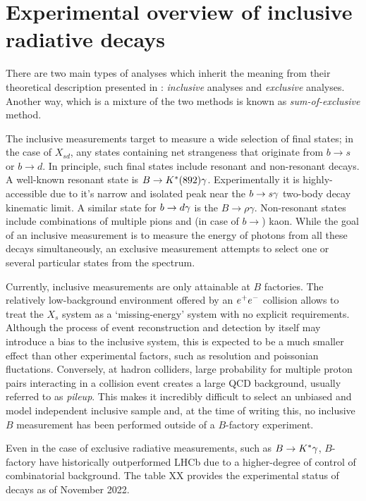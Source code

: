 \chapter{Experimental overview of inclusive radiative decays}

There are two main types of analyses which inherit the meaning from their theoretical description presented in : \textit{inclusive} analyses and \textit{exclusive} analyses.
Another way, which is a mixture of the two methods is known as \textit{sum-of-exclusive} method.

The inclusive measurements target to measure a wide selection of final states; in the case of $X_{sd}$, any states containing net strangeness that originate from $b\to s$ or $b\to d$.
In principle, such final states include resonant and non-resonant decays.
A well-known resonant state is $B\rightarrow K^*(892)\gamma$.
Experimentally it is highly-accessible due to it's narrow and isolated peak near the $b\rightarrow s\gamma$ two-body decay kinematic limit.
A similar state for $b\rightarrow d\gamma$ is the $B\rightarrow \rho\gamma$.
Non-resonant states include combinations of multiple pions and (in case of $b\rightarrow$) kaon.
While the goal of an inclusive measurement is to measure the energy of photons from all these decays simultaneously, an exclusive measurement attempts to select one or several particular states from the spectrum.

Currently, inclusive measurements are only attainable at $B$ factories.
The relatively low-background environment offered by an $e^+e^-$ collision allows to treat the $X_s$ system as a `missing-energy' system with no explicit requirements.
Although the process of event reconstruction and detection by itself may introduce a bias to the inclusive system, this is expected to be a much smaller effect than other experimental factors, such as resolution and poissonian fluctations.
Conversely, at hadron colliders, large probability for multiple proton pairs interacting in a collision event creates a large QCD background, usually referred to as \textit{pileup}.
This makes it incredibly difficult to select an unbiased and model independent inclusive sample and,
at the time of writing this, no inclusive $B$ measurement has been performed outside of a $B$-factory experiment.

Even in the case of exclusive radiative measurements, such as $B\rightarrow K^*\gamma$, $B$-factory have historically outperformed LHCb due to a higher-degree of control of combinatorial background.
The table XX provides the experimental status of \BtoXsgamma decays as of November 2022.

